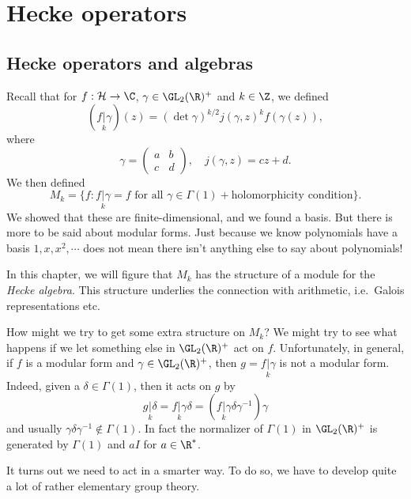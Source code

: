 \documentclass[a4paper]{article}
\renewcommand{\H}{\mathcal{H}}
\begin{document}
\section{Hecke operators}
\subsection{Hecke operators and algebras}
Recall that for $f: \H \to \C$, $\gamma \in \GL_2(\R)^+$ and $k \in \Z$, we defined
\[
  (f\underset{k}{|} \gamma)(z) = (\det \gamma)^{k/2} j(\gamma, z)^k f(\gamma(z)),
\]
where
\[
  \gamma =
  \begin{pmatrix}
    a & b\\
    c & d
  \end{pmatrix},\quad j(\gamma, z) = cz + d.
\]
We then defined
\[
  M_k = \{f: f \underset{k}{|} \gamma = f\text{ for all }\gamma \in \Gamma(1) + \text{holomorphicity condition}\}.
\]
We showed that these are finite-dimensional, and we found a basis. But there is more to be said about modular forms. Just because we know polynomials have a basis $1, x, x^2, \cdots$ does not mean there isn't anything else to say about polynomials!

In this chapter, we will figure that $M_k$ has the structure of a module for the \emph{Hecke algebra}. This structure underlies the connection with arithmetic, i.e.\ Galois representations etc.

How might we try to get some extra structure on $M_k$? We might try to see what happens if we let something else in $\GL_2(\R)^+$ act on $f$. Unfortunately, in general, if $f$ is a modular form and $\gamma \in \GL_2(\R)^+$, then $g = f \underset{k}{|} \gamma$ is not a modular form. Indeed, given a $\delta\in \Gamma(1)$, then it acts on $g$ by
\[
  g\underset{k}{|} \delta = f\underset{k}{|} \gamma\delta = (f\underset{k}{|} \gamma \delta \gamma^{-1})\gamma
\]
and usually $\gamma \delta \gamma^{-1} \not \in \Gamma(1)$. In fact the normalizer of $\Gamma(1)$ in $\GL_2(\R)^+$ is generated by $\Gamma(1)$ and $aI$ for $a \in \R^*$.

It turns out we need to act in a smarter way. To do so, we have to develop quite a lot of rather elementary group theory.
\end{document}
